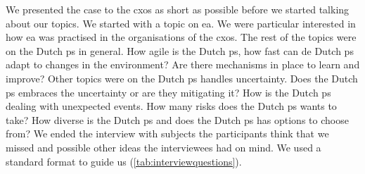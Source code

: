 We presented the case to the \glspl{cxo} as short as possible before we started talking about our topics. We started with a topic on \gls{ea}. We were particular interested in how \gls{ea} was practised in the organisations of the \glspl{cxo}. The rest of the topics were on the Dutch \gls{ps} in general. How \gls{agile} is the Dutch \gls{ps}, how fast can de Dutch \gls{ps} adapt to changes in the environment? Are there mechanisms in place to learn and improve? Other topics were on the Dutch \gls{ps} handles \gls{uncertainty}. Does the Dutch \gls{ps} embraces the \gls{uncertainty} or are they mitigating it? How is the Dutch \gls{ps} dealing with unexpected events. How many risks does the Dutch \gls{ps} wants to take? How diverse is the Dutch \gls{ps} and does the Dutch \gls{ps} has options to choose from? We ended the interview with subjects the participants think that we missed and possible other ideas the interviewees had on mind. We used a standard format to guide us (\cref{tab:interviewquestions}).

